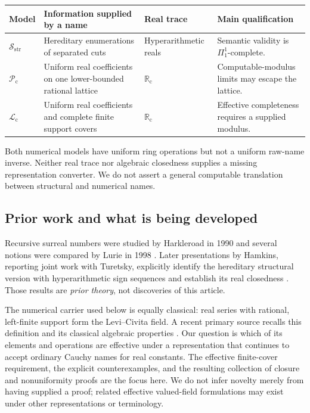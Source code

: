 \documentclass[11pt,letterpaper]{article}
\numberwithin{equation}{section}
\theoremstyle{definition}
\theoremstyle{remark}
\newcommand{\Rc}{\mathbb R_{\mathrm c}}
\newcommand{\Sc}{\mathcal S_{\mathrm{str}}}
\newcommand{\Lc}{\mathcal L_{\mathrm c}}
\newcommand{\Pc}{\mathcal P_{\mathrm c}}
\begin{document}
\begin{center}
\renewcommand{\arraystretch}{1.17}
\begin{tabular}{@{}p{}p{}p{}p{}@{}}
\toprule
Model & Information supplied by a name & Real trace & Main qualification\\
\midrule
$\Sc$ & Hereditary enumerations of separated cuts & Hyperarithmetic reals &
Semantic validity is $\Pi^1_1$-complete.\\
$\Pc$ & Uniform real coefficients on one lower-bounded rational lattice &
$\Rc$ & Computable-modulus limits may escape the lattice.\\
$\Lc$ & Uniform real coefficients and complete finite support covers &
$\Rc$ & Effective completeness requires a supplied modulus.\\
\bottomrule
\end{tabular}
\end{center}
Both numerical models have uniform ring operations but not a uniform raw-name
inverse. Neither real trace nor algebraic closedness supplies a missing
representation converter. We do not assert a general computable translation
between structural and numerical names.

\subsection{Prior work and what is being developed}

Recursive surreal numbers were studied by Harkleroad in 1990 and several
notions were compared by Lurie in 1998 \cite{harkleroad,lurie}. Later
presentations by Hamkins, reporting joint work with Turetsky, explicitly
identify the hereditary structural version with hyperarithmetic sign
sequences and establish its real closedness \cite{hamkins,hamkins2025,turetsky}.
Those results are \emph{prior theory}, not discoveries of this article.

The numerical carrier used below is equally classical: real series with
rational, left-finite support form the Levi--Civita field. A recent primary
source recalls this definition and its classical algebraic properties
\cite[\S1.1]{restrepo}. Our question is which of its elements and operations
are effective under a representation that continues to accept ordinary
Cauchy names for real constants. The effective finite-cover requirement,
the explicit counterexamples, and the resulting collection of closure and
nonuniformity proofs are the focus here. We do not infer novelty merely
from having supplied a proof; related effective valued-field formulations
may exist under other representations or terminology.
\end{document}

